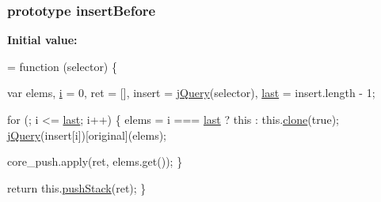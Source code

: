 \subsubsection[{\texorpdfstring{insert\+Before}{insertBefore}}]{ {\bf prototype} insert\+Before}\hypertarget{jquery-2_82_81-vsdoc_8js_a5501f909e772d4b753879c11efe9b64f}{}\label{jquery-2_82_81-vsdoc_8js_a5501f909e772d4b753879c11efe9b64f}
{\bfseries Initial value\+:}
\begin{DoxyCode}
= \textcolor{keyword}{function} (selector) \{
        

        var elems,
            \hyperlink{geolocation-marker_8js_a0325b7ce0988782a8032e720ef3aa411}{i} = 0,
            ret = [],
            insert = \hyperlink{jquery-2_82_81-vsdoc_8js_add5237586d970a38a81f990e8eb28c6c}{jQuery}(selector),
            \hyperlink{jquery-2_82_81-vsdoc_8js_a5a9684d230de11a6ec3029bcce128977}{last} = insert.length - 1;

        \textcolor{keywordflow}{for} (; i <= \hyperlink{jquery-2_82_81-vsdoc_8js_a5a9684d230de11a6ec3029bcce128977}{last}; i++) \{
            elems = i === \hyperlink{jquery-2_82_81-vsdoc_8js_a5a9684d230de11a6ec3029bcce128977}{last} ? \textcolor{keyword}{this} : this.\hyperlink{jquery-2_82_81-vsdoc_8js_a7d74ce76585989b4b6e2d506577e13ad}{clone}(\textcolor{keyword}{true});
            \hyperlink{jquery-2_82_81-vsdoc_8js_add5237586d970a38a81f990e8eb28c6c}{jQuery}(insert[i])[original](elems);

            
            core\_push.apply(ret, elems.get());
        \}

        \textcolor{keywordflow}{return} this.\hyperlink{jquery-2_82_81-vsdoc_8js_afc3a7db1ef2b526338c06c07cecccd44}{pushStack}(ret);
    \}
\end{DoxyCode}
